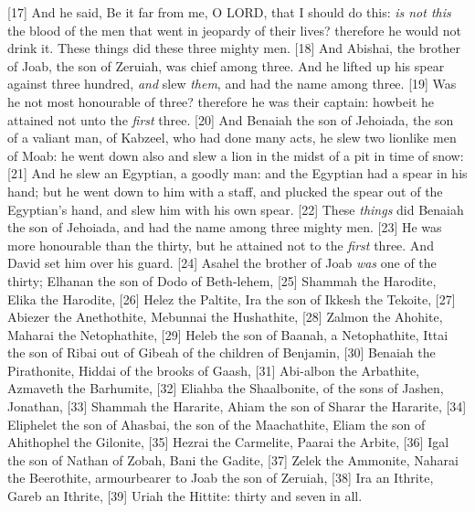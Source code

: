 [17] \textcolor[rgb]{0.00,0.00,1.00}{And he said, Be it far from me, O LORD, that I should do this: \emph{is not this} the blood of the men that went in jeopardy of their lives? therefore he would not drink it. These things did these three mighty men.}
[18] \textcolor[rgb]{0.00,0.00,1.00}{And Abishai, the brother of Joab, the son of Zeruiah, was chief among three. And he lifted up his spear against three hundred, \emph{and} slew \emph{them}, and had the name among three.}
[19] \textcolor[rgb]{0.00,0.00,1.00}{Was he not most honourable of three? therefore he was their captain: howbeit he attained not unto the \emph{first} three.}
[20] \textcolor[rgb]{0.00,0.00,1.00}{And Benaiah the son of Jehoiada, the son of a valiant man, of Kabzeel, who had done many acts, he slew two lionlike men of Moab: he went down also and slew a lion in the midst of a pit in time of snow:}
[21] \textcolor[rgb]{0.00,0.00,1.00}{And he slew an Egyptian, a goodly man: and the Egyptian had a spear in his hand; but he went down to him with a staff, and plucked the spear out of the Egyptian's hand, and slew him with his own spear.}
[22] \textcolor[rgb]{0.00,0.00,1.00}{These \emph{things} did Benaiah the son of Jehoiada, and had the name among three mighty men.}
[23] \textcolor[rgb]{0.00,0.00,1.00}{He was more honourable than the thirty, but he attained not to the \emph{first} three. And David set him over his guard.}
[24] \textcolor[rgb]{0.00,0.00,1.00}{Asahel the brother of Joab \emph{was} one of the thirty; Elhanan the son of Dodo of Beth-lehem,}
[25] \textcolor[rgb]{0.00,0.00,1.00}{Shammah the Harodite, Elika the Harodite,}
[26] \textcolor[rgb]{0.00,0.00,1.00}{Helez the Paltite, Ira the son of Ikkesh the Tekoite,}
[27] \textcolor[rgb]{0.00,0.00,1.00}{Abiezer the Anethothite, Mebunnai the Hushathite,}
[28] \textcolor[rgb]{0.00,0.00,1.00}{Zalmon the Ahohite, Maharai the Netophathite,}
[29] \textcolor[rgb]{0.00,0.00,1.00}{Heleb the son of Baanah, a Netophathite, Ittai the son of Ribai out of Gibeah of the children of Benjamin,}
[30] \textcolor[rgb]{0.00,0.00,1.00}{Benaiah the Pirathonite, Hiddai of the brooks of Gaash,}
[31] \textcolor[rgb]{0.00,0.00,1.00}{Abi-albon the Arbathite, Azmaveth the Barhumite,}
[32] \textcolor[rgb]{0.00,0.00,1.00}{Eliahba the Shaalbonite, of the sons of Jashen, Jonathan,}
[33] \textcolor[rgb]{0.00,0.00,1.00}{Shammah the Hararite, Ahiam the son of Sharar the Hararite,}
[34] \textcolor[rgb]{0.00,0.00,1.00}{Eliphelet the son of Ahasbai, the son of the Maachathite, Eliam the son of Ahithophel the Gilonite,}
[35] \textcolor[rgb]{0.00,0.00,1.00}{Hezrai the Carmelite, Paarai the Arbite,}
[36] \textcolor[rgb]{0.00,0.00,1.00}{Igal the son of Nathan of Zobah, Bani the Gadite,}
[37] \textcolor[rgb]{0.00,0.00,1.00}{Zelek the Ammonite, Naharai the Beerothite, armourbearer to Joab the son of Zeruiah,}
[38] \textcolor[rgb]{0.00,0.00,1.00}{Ira an Ithrite, Gareb an Ithrite,}
[39] \textcolor[rgb]{0.00,0.00,1.00}{Uriah the Hittite: thirty and seven in all.}
\newpage
